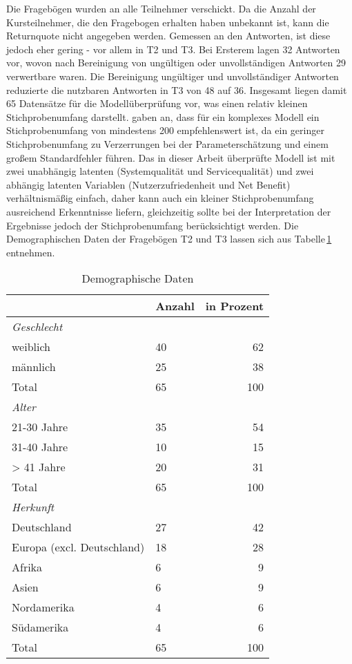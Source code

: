 Die Fragebögen wurden an alle Teilnehmer verschickt. Da die Anzahl der Kursteilnehmer, die den Fragebogen erhalten haben unbekannt ist, kann die Returnquote nicht angegeben werden. Gemessen an den Antworten, ist diese jedoch eher gering - vor allem in T2 und T3. Bei Ersterem lagen 32 Antworten vor, wovon nach Bereinigung von ungültigen oder unvollständigen Antworten 29 verwertbare waren. Die Bereinigung ungültiger und unvollständiger Antworten reduzierte die nutzbaren Antworten in T3 von 48 auf 36. Insgesamt liegen damit 65 Datensätze für die Modellüberprüfung vor, was einen relativ kleinen Stichprobenumfang darstellt. \textcite[S. 5]{jakobowicz2006understanding} gaben an, dass für ein komplexes Modell ein Stichprobenumfang von mindestens 200 empfehlenswert ist, da ein geringer Stichprobenumfang zu Verzerrungen bei der Parameterschätzung und einem großem Standardfehler führen. Das in dieser Arbeit überprüfte Modell ist mit zwei unabhängig latenten (Systemqualität und Servicequalität) und zwei abhängig latenten Variablen (Nutzerzufriedenheit und Net Benefit) verhältnismäßig einfach, daher kann auch ein kleiner Stichprobenumfang ausreichend Erkenntnisse liefern, gleichzeitig sollte bei der Interpretation der Ergebnisse jedoch der Stichprobenumfang berücksichtigt werden. 
Die Demographischen Daten der Fragebögen T2 und T3 lassen sich aus Tabelle\,\ref{tab:Demographische Daten} entnehmen. 
 

\begin{table}[ht] 
\footnotesize
\caption{Demographische Daten}
\label{tab:Demographische Daten} 
\begin{tabular}{@{}lp{5cm}r@{}} \toprule

 & \textbf{Anzahl}&\textbf{in Prozent} \\ \midrule

\textit{Geschlecht}		& 				& \\ 
weiblich 				&  40 			& 62 \\
männlich				&  25			& 38 \\ 
Total					&  65			& 100 \\
\textit{Alter}			& 				&   \\
21-30 Jahre				&  35			& 54 \\
31-40 Jahre				&  10			& 15	  \\
> 41 Jahre				&  20 			& 31 \\
Total 					&  65			& 100 \\
\textit{Herkunft}		&				&   \\
Deutschland				& 27 			& 42  \\
Europa (excl. Deutschland) &18			& 28  \\
Afrika 					& 6				& 9   \\
Asien 					& 6				& 9   \\
Nordamerika				& 4				& 6   \\
Südamerika				& 4				& 6	 \\
Total					& 65				& 100  \\ 
  \bottomrule

\end{tabular}	
\end{table}


